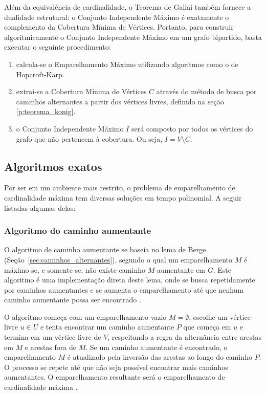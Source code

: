 Além da equivalência de cardinalidade, o Teorema de Gallai também fornece a dualidade estrutural: o Conjunto Independente Máximo é exatamente o complemento da Cobertura Mínima de Vértices. Portanto, para construir algoritmicamente o Conjunto Independente Máximo em um grafo bipartido, basta executar o seguinte procedimento:

\begin{enumerate}
    \item calcula-se o Emparelhamento Máximo utilizando algoritmos como o de Hopcroft-Karp.\;
    \item extrai-se a Cobertura Mínima de Vértices $C$ através do método de busca por caminhos alternantes a partir dos vértices livres, definido na seção \ref{p:teorema_konig}.\;
    \item o Conjunto Independente Máximo $I$ será composto por todos os vértices do grafo que não pertencem à cobertura. Ou seja, $I = V \setminus C$.
\end{enumerate}

\subsection{Algoritmos exatos}
\label{sec:algos_exatos_emp_card_max}

Por ser em um ambiente mais restrito, o problema de emparelhamento de cardinalidade máxima tem diversas soluções em tempo polinomial. A seguir listadas algumas delas:

\subsubsection{Algoritmo do caminho aumentante}

O algoritmo de caminho aumentante se baseia no lema de Berge (Seção~\ref{sec:caminhos_alternantes}), segundo o qual um emparelhamento $M$ é máximo se, e somente se, não existe caminho $M$-aumentante em $G$. Este algoritmo é uma implementação direta deste lema, onde se busca repetidamente por caminhos aumentantes e se aumenta o emparelhamento até que nenhum caminho aumentante possa ser encontrado \cite{lawler}.

O algoritmo começa com um emparelhamento vazio $M=\emptyset$, escolhe um vértice livre $u \in U$ e tenta encontrar um caminho aumentante $P$ que começa em $u$ e termina em um vértice livre de $V$, respeitando a regra da alternância entre arestas em $M$ e arestas fora de $M$. Se um caminho aumentante é encontrado, o emparelhamento $M$ é atualizado pela inversão das arestas ao longo do caminho $P$. O processo se repete até que não seja possível encontrar mais caminhos aumentantes. O emparelhamento resultante será o emparelhamento de cardinalidade máxima \cite{halim}.


